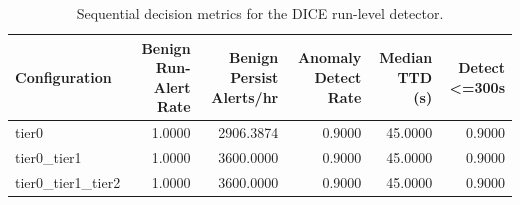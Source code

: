 \begin{table}[t]
\centering
\caption{Sequential decision metrics for the DICE run-level detector.}
\label{tab:dice_sequential_metrics}
\footnotesize
\begin{tabular}{lrrrrr}
\toprule
Configuration & Benign Run-Alert Rate & Benign Persist Alerts/hr & Anomaly Detect Rate & Median TTD (s) & Detect <=300s \\
\midrule
tier0 & 1.0000 & 2906.3874 & 0.9000 & 45.0000 & 0.9000 \\
tier0_tier1 & 1.0000 & 3600.0000 & 0.9000 & 45.0000 & 0.9000 \\
tier0_tier1_tier2 & 1.0000 & 3600.0000 & 0.9000 & 45.0000 & 0.9000 \\
\bottomrule
\end{tabular}

\end{table}
